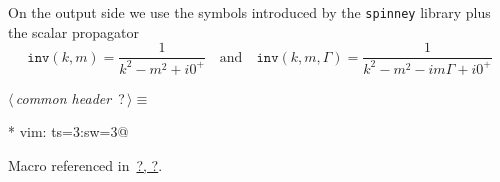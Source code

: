 \documentclass[a4paper,12pt]{amsart}
\renewcommand{\NWtarget}[2]{\hypertarget{#1}{#2}}
\renewcommand{\NWlink}[2]{\hyperlink{#1}{#2}}
\renewcommand{\NWtxtMacroRefIn}{Macro referenced in}
\renewcommand{\NWsep}{${\diamond}$}
\begin{document}
On the output side we use the symbols introduced by the \texttt{spinney}
library plus the scalar propagator
\begin{equation}
\mathtt{inv}(k, m) = \frac{1}{k^2-m^2+i0^+}\quad\text{and}\quad
\mathtt{inv}(k, m,\Gamma) = \frac{1}{k^2-m^2-im\Gamma+i0^+}
\end{equation}
\begin{flushleft} \small
\begin{minipage}{\linewidth}\label{scrap1}\raggedright\small
\NWtarget{nuweb?}{} $\langle\,${\it common header}\nobreak\ {\footnotesize {?}}$\,\rangle\equiv$
\vspace{-1ex}
\begin{list}{}{} \item
\mbox{}\verb@* vim: ts=3:sw=3@\\
\mbox{}\verb@@{\NWsep}
\end{list}
\vspace{-1.5ex}
\footnotesize
\begin{list}{}{\setlength{\itemsep}{-\parsep}\setlength{\itemindent}{-\leftmargin}}
\item \NWtxtMacroRefIn\ \NWlink{nuweb?}{?}\NWlink{nuweb?}{, ?}.

\item{}
\end{list}
\end{minipage}\vspace{4ex}
\end{flushleft}
\end{document}
